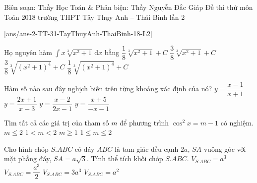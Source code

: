 \begin{name}
{Biên soạn: Thầy Học Toán \& Phản biện: Thầy Nguyễn Đắc Giáp}
{Đề thi thử môn Toán 2018 trường THPT Tây Thụy Anh – Thái Bình lần 2}
\end{name}
\setcounter{ex}{0}\setcounter{bt}{0}
[ans/ans-2-TT-31-TayThuyAnh-ThaiBinh-18-L2]

\begin{ex}%
Họ nguyên hàm $\displaystyle\int\limits x\sqrt[3]{x^2+1} \mathrm{\,d}x$ bằng
\choice
{$\dfrac{1}{8}\sqrt[3]{x^2+1}+C$}
{$\dfrac{3}{8}\sqrt[3]{x^2+1}+C$}
{\True $\dfrac{3}{8}\sqrt[3]{(x^2+1)^4}+C$}
{$\dfrac{1}{8}\sqrt[3]{(x^2+1)^4}+C$}
\end{ex}

\begin{ex}%
Hàm số nào sau đây nghịch biến trên từng khoảng xác định của nó?
\choice
{$y=\dfrac{x-1}{x+1}$}
{\True $y=\dfrac{2x+1}{x-3}$}
{$y=\dfrac{x-2}{2x-1}$}
{$y=\dfrac{x+5}{-x-1}$}
\end{ex}

\begin{ex}%
Tìm tất cả các giá trị của tham số $m$ để phương trình $\cos^2x=m-1$ có nghiệm.
\choice
{$m\leq 2$}
{$1<m<2$}
{$m\geq 1$}
{\True $1\leq m\leq 2$}
\end{ex}

\begin{ex}%
Cho hình chóp $S.ABC$ có đáy $ABC$ là tam giác đều cạnh $2a$, $SA$ vuông góc với mặt phẳng đáy, $SA=a\sqrt{3}$. Tính thể tích khối chóp $S.ABC$.
\choice
{\True $V_{S.ABC}=a^3$}
{$V_{S.ABC}=\dfrac{a^3}{2}$}
{$V_{S.ABC}=3a^3$}
{$V_{S.ABC}=a^2$}
\end{ex}

